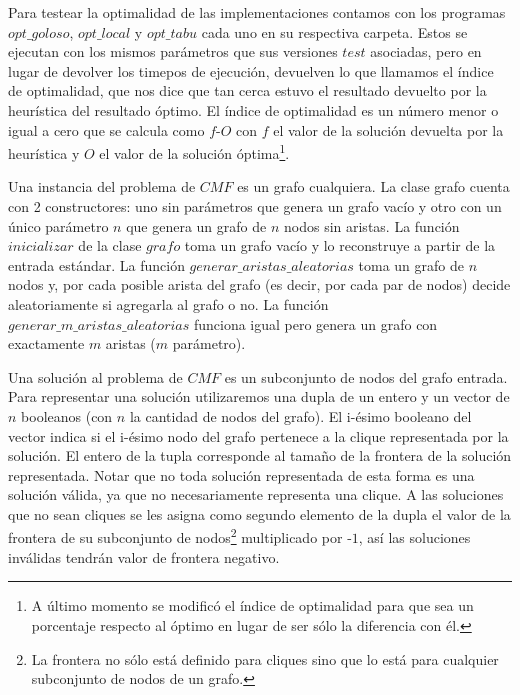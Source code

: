\par{Para testear la optimalidad de las implementaciones contamos con los
programas $opt\_goloso$, $opt\_local$ y $opt\_tabu$ cada uno en su respectiva
carpeta. Estos se ejecutan con los mismos parámetros que sus versiones $test$
asociadas, pero en lugar de devolver los timepos de ejecución, devuelven
lo que llamamos el índice de optimalidad, que nos dice que tan cerca estuvo
el resultado devuelto por la heurística del resultado óptimo. El índice de
optimalidad es un número menor o igual a cero que se calcula como $f$-$O$
con $f$ el valor de la solución devuelta por la heurística y $O$ el valor
de la solución óptima\footnote{A último momento se modificó el índice
de optimalidad para que sea un porcentaje respecto al óptimo en lugar
de ser sólo la diferencia con él.}.}\\

\par{Una instancia del problema de $CMF$ es un grafo cualquiera. La clase
grafo cuenta con 2 constructores: uno sin parámetros que genera un grafo
vacío y otro con un único parámetro $n$ que genera un grafo de $n$ nodos
sin aristas. La función $inicializar$ de la clase $grafo$ toma un grafo vacío
y lo reconstruye a partir de la entrada estándar. La función
$generar\_aristas\_aleatorias$ toma un grafo de $n$ nodos y, por cada posible
arista del grafo (es decir, por cada par de nodos) decide aleatoriamente
si agregarla al grafo o no. La función $generar\_m\_aristas\_aleatorias$
funciona igual pero genera un grafo con exactamente $m$ aristas ($m$ parámetro).}\\

\par{Una solución al problema de $CMF$ es un subconjunto de nodos del
grafo entrada. Para representar una solución utilizaremos una dupla
de un entero y un vector de $n$ booleanos (con $n$ la cantidad de nodos
del grafo). El i-ésimo booleano del vector indica si el i-ésimo nodo del
grafo pertenece a la clique representada por la solución. El entero de la
tupla corresponde al tamaño de la frontera de la solución representada. Notar
que no toda solución representada de esta forma es una solución válida, ya
que no necesariamente representa una clique. A las soluciones que no sean
cliques se les asigna como segundo elemento de la dupla el valor de la
frontera de su subconjunto de nodos\footnote{La frontera no sólo está
definido para cliques sino que lo está para cualquier subconjunto de nodos
de un grafo.}
multiplicado por -$1$, así las soluciones inválidas tendrán
valor de frontera negativo.}
